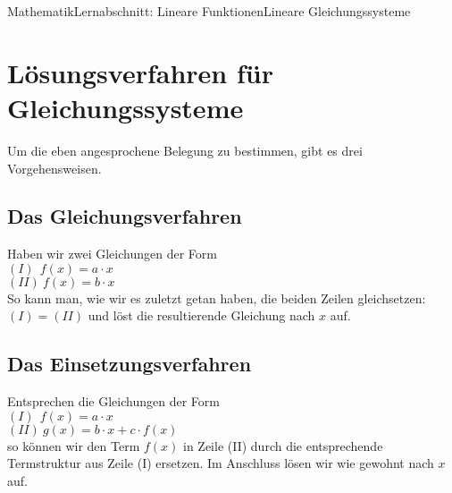 \documentclass[11pt,twocolumn,oneside,openany,headings=optiontotoc,11pt,numbers=noenddot]{article}
\begin{document}
\begin{worksheet}{Mathematik}{Lernabschnitt: Lineare Funktionen}{Lineare Gleichungssysteme}
		\section*{Lösungsverfahren für Gleichungssysteme}
		Um die eben angesprochene Belegung zu bestimmen, gibt es drei Vorgehensweisen.
		\subsection{Das Gleichungsverfahren}
		Haben wir zwei Gleichungen der Form\\
		\((I)\ \ f(x) = a\cdot{}x\)\\
		\((II)\ f(x) = b\cdot{}x\)\\
		So kann man, wie wir es zuletzt getan haben, die beiden Zeilen gleichsetzen: \((I) = (II)\) und löst die resultierende Gleichung nach \(x\) auf.
		\subsection{Das Einsetzungsverfahren}
		Entsprechen die Gleichungen der Form\\
		\((I)\ \ f(x) = a\cdot{}x\)\\
		\((II)\ g(x) = b\cdot{}x + c\cdot{}f(x)\)\\
		so können wir den Term \(f(x)\) in Zeile (II) durch die entsprechende Termstruktur aus Zeile (I) ersetzen. Im Anschluss lösen wir wie gewohnt nach \(x\) auf.

\end{worksheet}
\end{document}
